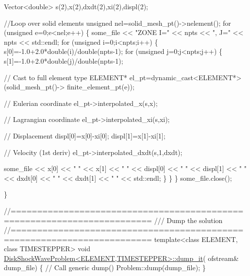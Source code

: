 \begin{DoxyCodeInclude}
{{{{{{{ Vector<double> s(2),x(2),dxdt(2),xi(2),displ(2);

 \textcolor{comment}{//Loop over solid elements}
 \textcolor{keywordtype}{unsigned} nel=solid\_mesh\_pt()->nelement();
 \textcolor{keywordflow}{for} (\textcolor{keywordtype}{unsigned} e=0;e<nel;e++)
  \{
   some\_file << \textcolor{stringliteral}{"ZONE I="} << npts << \textcolor{stringliteral}{", J="} << npts << std::endl;
   \textcolor{keywordflow}{for} (\textcolor{keywordtype}{unsigned} i=0;i<npts;i++)
    \{
     s[0]=-1.0+2.0*double(i)/double(npts-1);
     \textcolor{keywordflow}{for} (\textcolor{keywordtype}{unsigned} j=0;j<npts;j++)
      \{
       s[1]=-1.0+2.0*double(j)/double(npts-1);

       \textcolor{comment}{// Cast to full element type}
       ELEMENT* el\_pt=\textcolor{keyword}{dynamic\_cast<}ELEMENT*\textcolor{keyword}{>}(solid\_mesh\_pt()->
                                             finite\_element\_pt(e));

       \textcolor{comment}{// Eulerian coordinate}
       el\_pt->interpolated\_x(s,x);

       \textcolor{comment}{// Lagrangian coordinate}
       el\_pt->interpolated\_xi(s,xi);

       \textcolor{comment}{// Displacement}
       displ[0]=x[0]-xi[0];
       displ[1]=x[1]-xi[1];

       \textcolor{comment}{// Velocity (1st deriv)}
       el\_pt->interpolated\_dxdt(s,1,dxdt);

       some\_file << x[0] << \textcolor{stringliteral}{" "} << x[1] << \textcolor{stringliteral}{" "} 
                 << displ[0] << \textcolor{stringliteral}{" "} << displ[1] << \textcolor{stringliteral}{" "}  
                 << dxdt[0] << \textcolor{stringliteral}{" "} << dxdt[1] << \textcolor{stringliteral}{" "}  
                 << std::endl;
      \}
    \}
  \}
 some\_file.close(); 

\}



\textcolor{comment}{//========================================================================}\textcolor{comment}{}
\textcolor{comment}{/// Dump the solution}
\textcolor{comment}{}\textcolor{comment}{//========================================================================}
\textcolor{keyword}{template}<\textcolor{keyword}{class} ELEMENT, \textcolor{keyword}{class} TIMESTEPPER>
\textcolor{keywordtype}{void} \hyperlink{classDiskShockWaveProblem_a2eaf91d3e0eb5f37b9920fc3d9d54cb9}{DiskShockWaveProblem<ELEMENT,TIMESTEPPER>::dump\_it}(
      ofstream& dump\_file)
\{
 \textcolor{comment}{// Call generic dump()}
 Problem::dump(dump\_file);
\}



}}}}}}}
\end{DoxyCodeInclude}
